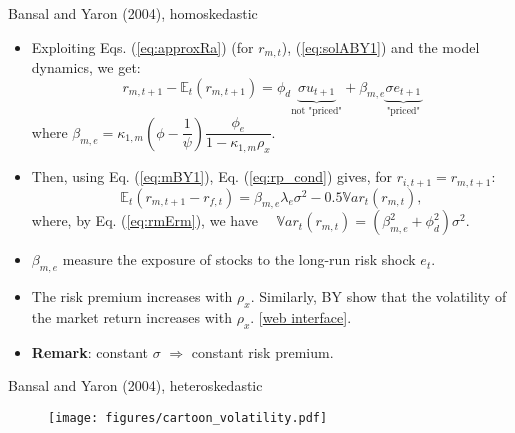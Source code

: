 \begin{frame}{Bansal and Yaron (2004), homoskedastic}
\begin{footnotesize}
\begin{itemize}
	\item Exploiting Eqs. (\ref{eq:approxRa}) (for $r_{m,t}$), (\ref{eq:solABY1}) and the model dynamics, we get:
	\begin{equation}\label{eq:rmErm}
	r_{m,t+1} - \mathbb{E}_t(r_{m,t+1}) = \phi_d  \underbrace{\sigma u_{t+1}}_{\mbox{not "priced"}} + \beta_{m,e}  \underbrace{ \sigma e_{t+1}}_{\mbox{"priced"}}
	\end{equation}
	where $\beta_{m,e} = \kappa_{1,m}\left(\phi - \dfrac{1}{\psi}\right)\dfrac{\phi_e}{1 - \kappa_{1,m} \rho_x}$.
	\item Then, using Eq. (\ref{eq:mBY1}), Eq. (\ref{eq:rp_cond}) gives, for $r_{i,t+1}=r_{m,t+1}$:
	\begin{equation}\label{eq:xsBYhomo}
	\mathbb{E}_t(r_{m,t+1} - r_{f,t}) = \beta_{m,e}\lambda_{e} \sigma^2 - 0.5 \mathbb{V}ar_t(r_{m,t}),
	\end{equation}
	where, by Eq. (\ref{eq:rmErm}), we have $\quad\mathbb{V}ar_t(r_{m,t})=(\beta_{m,e}^2+\phi_d^2)\sigma^2$.
	\item $\beta_{m,e}$ measure the exposure of stocks to the long-run risk shock $e_t$.
	\item The risk premium increases with $\rho_x$. Similarly, BY show that the volatility of the market return increases with $\rho_x$. [\href{https://jrenne.shinyapps.io/LRRModels}{web interface}].
	\item {\bf Remark}: constant $\sigma$ $\Rightarrow$ constant risk premium.
\end{itemize}
\end{footnotesize}
\end{frame}


\begin{frame}{Bansal and Yaron (2004), heteroskedastic}
		\begin{figure}
			\texttt{[image: figures/cartoon\_volatility.pdf]}
		\end{figure}
\end{frame}

